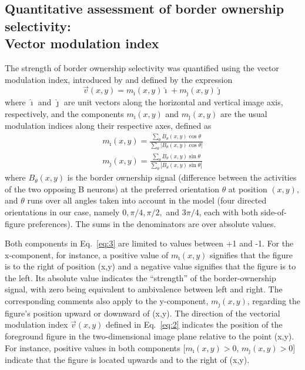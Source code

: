 \subsection{Quantitative assessment of border ownership selectivity:\\
  Vector modulation index}
\label{sec:vmi}
The strength of border ownership selectivity was quantified using the
vector modulation index, introduced by \cite{Craft_etal07} and defined
by the expression 
\begin{equation}
\label{eq:2}
\vec{v}(x,y) = m_{\hat{\imath}}(x,y)\hat{\imath} + m_{\hat{\jmath}}(x,y)\hat{\jmath}
\end{equation}
where $\hat{\imath}$ and $\hat{\jmath}$ are unit vectors along the horizontal and vertical image axis, respectively, and the components $m_{\hat{\imath}}(x,y)$ and $m_{\hat{\jmath}}(x,y)$ are the usual modulation indices along their respective axes, defined as
\begin{equation}
\label{eq:3}
\begin{split}
	m_{\hat{\imath}}(x,y) = \frac{\sum_{\theta}
        B_{\theta}(x,y)\cos\theta}{\sum_{\theta}
                \left|B_{\theta}(x,y)\cos\theta\right|} \\
	m_{\hat{\jmath}}(x,y) = \frac{\sum_{\theta}
        B_{\theta}(x,y)\sin\theta}{\sum_{\theta}
                \left|B_{\theta}(x,y)\sin\theta\right|}
\end{split}
\end{equation}
where $B_{\theta}(x,y)$ is the border ownership signal (difference between
the activities of the two opposing B neurons) at the preferred orientation $\theta$ at position $(x,y)$, and $\theta$ runs over all
angles taken into account in the model (four directed orientations in our case, namely $0, \pi/4, \pi/2,$ and $3\pi/4$, each with both side-of-figure preferences). The sums in the denominators are over absolute values.

Both components in Eq.~\ref{eq:3} are limited to values between +1 and
-1. For the x-component, for instance, a positive value of $m_{\hat{\imath}}(x,y)$ signifies that the figure is to the right of
position (x,y) and a negative value signifies that the figure is to the left. Its absolute value indicates the ``strength'' of the border-ownership signal, with zero being equivalent to ambivalence between left and right. The corresponding comments also apply to the
y-component, $m_{\hat{\jmath}}(x,y)$, regarding the figure's position upward or downward of (x,y). The direction of the vectorial modulation
index $\vec{v}(x,y)$ defined in Eq.~\ref{eq:2} indicates the position of the foreground figure in the two-dimensional image plane relative to
the point (x,y). For instance, positive values in both components [$m_{\hat{\imath}}(x,y) > 0$, $m_{\hat{\jmath}}(x,y) > 0$] indicate that the figure is located upwards and to the right of (x,y).

